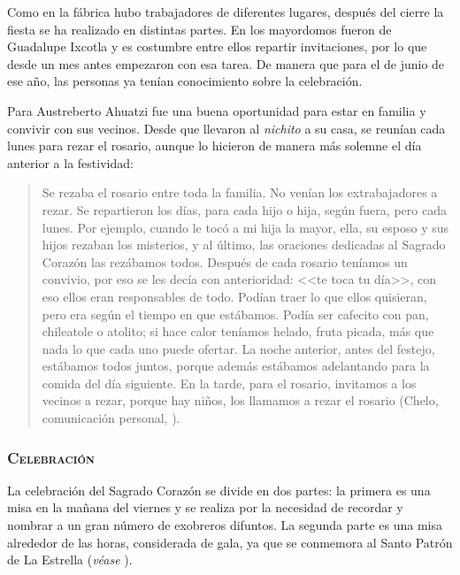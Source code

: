 \documentclass[14pt,letterpaper,twoside]{extbook} %
\begin{document}
Como en la fábrica hubo trabajadores de diferentes lugares, después del cierre la fiesta se ha realizado en distintas partes. En  los mayordomos fueron de Guadalupe Ixcotla y es costumbre entre ellos repartir invitaciones, por lo que desde un mes antes empezaron con esa tarea. De manera que para el  de junio de ese año, las personas ya tenían conocimiento sobre la celebración.

Para Austreberto Ahuatzi fue una buena oportunidad para estar en familia y convivir con sus vecinos. Desde que llevaron al \textit{nichito} a su casa, se reunían cada lunes para rezar el rosario, aunque lo hicieron de manera más solemne el día anterior a la festividad:

\begin{quotation}
\noindent Se rezaba el rosario entre toda la familia. No venían los extrabajadores a rezar. Se repartieron los días, para cada hijo o hija, según fuera, pero cada lunes. Por ejemplo, cuando le tocó a mi hija la mayor, ella, su esposo y sus hijos rezaban los misterios, y al último, las oraciones dedicadas al Sagrado Corazón las rezábamos todos. Después de cada rosario teníamos un convivio, por eso se les decía con anterioridad: <<te toca tu día>>, con eso ellos eran responsables de todo. Podían traer lo que ellos quisieran, pero era según el tiempo en que estábamos. Podía ser cafecito con pan, chileatole o atolito; si hace calor teníamos helado, fruta picada, más que nada lo que cada uno puede ofertar. La noche anterior, antes del festejo, estábamos todos juntos, porque además estábamos adelantando para la comida del día siguiente. En la tarde, para el rosario, invitamos a los vecinos a rezar, porque hay niños, los llamamos a rezar el rosario (Chelo, comunicación personal, ).
\end{quotation}

\subsubsection{\mdseries\textsc{Celebración }}

\noindent La celebración del Sagrado Corazón se divide en dos partes: la primera es una misa en la mañana del viernes y se realiza por la necesidad de recordar y nombrar a un gran número de exobreros difuntos. La segunda parte es una misa alrededor de las  horas, considerada de gala, ya que se conmemora al Santo Patrón de La Estrella (\emph{véase} ).
\end{document}
